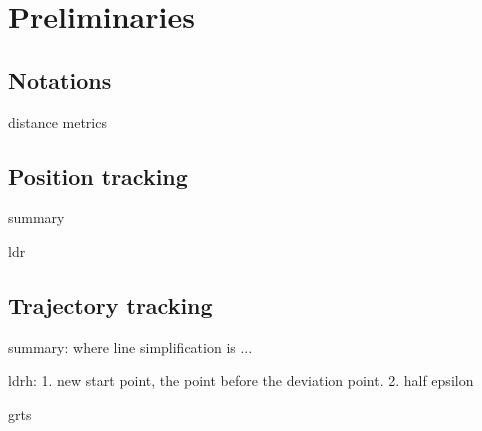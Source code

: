 



\section{Preliminaries}
\label{sec-pre}

\subsection{Notations}
distance metrics

\subsection{Position tracking}
summary

ldr

\subsection{Trajectory tracking}
summary: 
where line simplification is ...

ldrh: 1. new start point, the point before the deviation point. 2. half epsilon

grts




